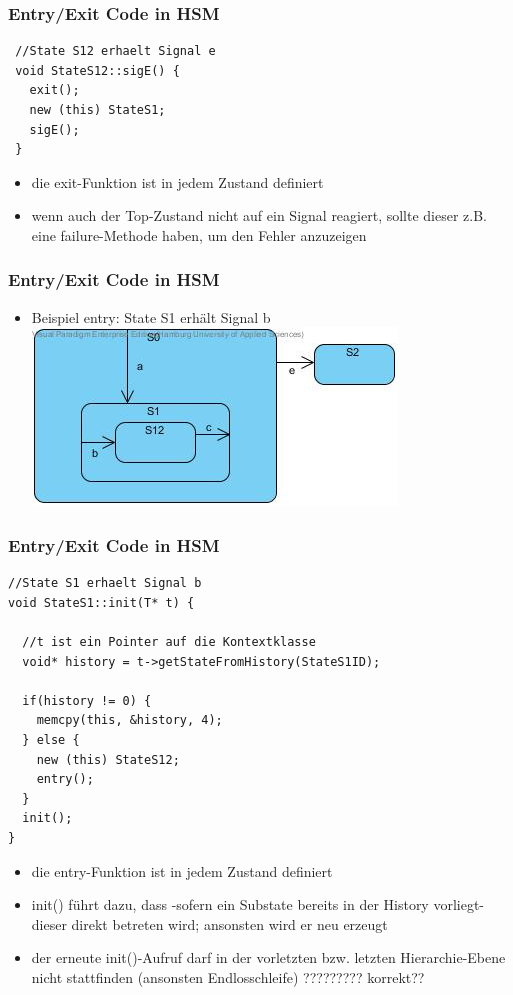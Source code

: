 \documentclass{beamer}
\begin{document}
\begin{frame}[fragile]
 \frametitle{Entry/Exit Code in HSM }
 \begin{lstlisting}
 //State S12 erhaelt Signal e
 void StateS12::sigE() {
   exit();
   new (this) StateS1;
   sigE();
 }
 \end{lstlisting}
 \begin{itemize}
  \item die exit-Funktion ist in jedem Zustand definiert
  \item wenn auch der Top-Zustand nicht auf ein Signal reagiert, sollte dieser z.B. eine
  failure-Methode haben, um den Fehler anzuzeigen
 \end{itemize}
\end{frame}

\begin{frame}
 \frametitle{Entry/Exit Code in HSM  }
 \begin{itemize}
  \item Beispiel entry: State S1 erh\"alt Signal b\newline\newline
  \includegraphics[scale=.6]{img/beispiel_entrySM}
 \end{itemize}
\end{frame}

\begin{frame}[fragile]
 \frametitle{Entry/Exit Code in HSM }
 \begin{lstlisting}
//State S1 erhaelt Signal b
void StateS1::init(T* t) {

  //t ist ein Pointer auf die Kontextklasse
  void* history = t->getStateFromHistory(StateS1ID);

  if(history != 0) {
    memcpy(this, &history, 4);
  } else {
    new (this) StateS12;
    entry();
  }
  init();
}
 \end{lstlisting}
\end{frame}

\begin{frame}[fragile]
 \begin{itemize}
  \item die entry-Funktion ist in jedem Zustand definiert
  \item init() f\"uhrt dazu, dass -sofern ein Substate bereits in der History vorliegt- dieser direkt betreten wird; ansonsten wird er neu erzeugt
  \item der erneute init()-Aufruf darf in der vorletzten bzw. letzten Hierarchie-Ebene nicht stattfinden (ansonsten Endlosschleife) ????????? korrekt??
 \end{itemize}
\end{frame}
\end{document}
